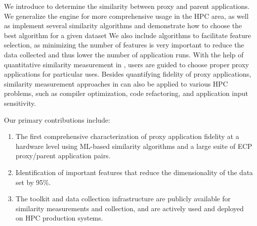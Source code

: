 We introduce \us to determine the similarity between proxy and parent applications. We generalize the engine for more comprehensive usage in the HPC area, as well as implement several similarity algorithms and demonstrate how to choose the best algorithm for a given dataset  We also include algorithms to facilitate feature selection, as minimizing the number of features is very important to reduce the data collected and thus lower the number of application runs.
With the help of quantitative similarity measurement in \us, users are guided to choose proper proxy applications for particular uses. Besides quantifying fidelity of proxy applications, similarity measurement approaches in \us can also be applied to various HPC problems, such as compiler optimization, code refactoring, and application input sensitivity.


Our primary contributions include:
\begin{enumerate}
    \item The first comprehensive characterization of proxy application fidelity at a hardware level using ML-based similarity algorithms and a large suite of ECP proxy/parent application pairs. %
    \item 
    Identification of important features that reduce the dimensionality of the data set by 95\%.
    \item The \us toolkit and data collection infrastructure are publicly available for similarity measurements and collection, and are actively used and deployed on HPC production systems. %
\end{enumerate}

